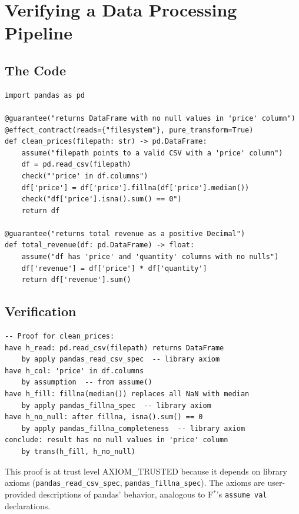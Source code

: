 \documentclass[11pt,a4paper]{report}
\theoremstyle{definition}
\theoremstyle{plain}
\newcommand{\fstar}{F$^{*}$}
\begin{document}
\chapter{Verifying a Data Processing Pipeline}
\label{ch:case-data}

\section{The Code}

\begin{lstlisting}[style=synhopy]
import pandas as pd

@guarantee("returns DataFrame with no null values in 'price' column")
@effect_contract(reads={"filesystem"}, pure_transform=True)
def clean_prices(filepath: str) -> pd.DataFrame:
    assume("filepath points to a valid CSV with a 'price' column")
    df = pd.read_csv(filepath)
    check("'price' in df.columns")
    df['price'] = df['price'].fillna(df['price'].median())
    check("df['price'].isna().sum() == 0")
    return df

@guarantee("returns total revenue as a positive Decimal")
def total_revenue(df: pd.DataFrame) -> float:
    assume("df has 'price' and 'quantity' columns with no nulls")
    df['revenue'] = df['price'] * df['quantity']
    return df['revenue'].sum()
\end{lstlisting}

\section{Verification}

\begin{lstlisting}[style=proof]
-- Proof for clean_prices:
have h_read: pd.read_csv(filepath) returns DataFrame
    by apply pandas_read_csv_spec  -- library axiom
have h_col: 'price' in df.columns
    by assumption  -- from assume()
have h_fill: fillna(median()) replaces all NaN with median
    by apply pandas_fillna_spec  -- library axiom
have h_no_null: after fillna, isna().sum() == 0
    by apply pandas_fillna_completeness  -- library axiom
conclude: result has no null values in 'price' column
    by trans(h_fill, h_no_null)
\end{lstlisting}

This proof is at trust level \textsf{AXIOM\_TRUSTED} because it depends on
library axioms (\texttt{pandas\_read\_csv\_spec}, \texttt{pandas\_fillna\_spec}).
The axioms are user-provided descriptions of pandas' behavior, analogous to
\fstar{}'s \lstinline[style=fstar]{assume val} declarations.
\end{document}
